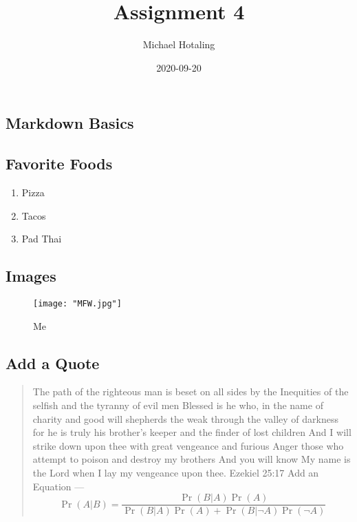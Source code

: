 \documentclass[
]{article}
\title{Assignment 4}
\author{Michael Hotaling}
\date{2020-09-20}
\providecommand{\tightlist}{%
  \setlength{\itemsep}{0pt}\setlength{\parskip}{0pt}}
\begin{document}
\maketitle

\hypertarget{markdown-basics}{%
\subsection{Markdown Basics}\label{markdown-basics}}

\hypertarget{favorite-foods}{%
\subsection{Favorite Foods}\label{favorite-foods}}

\begin{enumerate}
\def\labelenumi{\arabic{enumi}.}
\tightlist
\item
  Pizza
\item
  Tacos
\item
  Pad Thai
\end{enumerate}

\hypertarget{images}{%
\subsection{Images}\label{images}}

\begin{figure}
\centering
\texttt{[image: "MFW.jpg"]}
\caption{Me}
\end{figure}

\hypertarget{add-a-quote}{%
\subsection{Add a Quote}\label{add-a-quote}}

\begin{quote}
The path of the righteous man is beset on all sides by the Inequities of
the selfish and the tyranny of evil men Blessed is he who, in the name
of charity and good will shepherds the weak through the valley of
darkness for he is truly his brother's keeper and the finder of lost
children And I will strike down upon thee with great vengeance and
furious Anger those who attempt to poison and destroy my brothers And
you will know My name is the Lord when I lay my vengeance upon thee.
Ezekiel 25:17 Add an Equation --- \begin{equation}
\Pr(A|B)=\frac{\Pr(B|A)\Pr(A)}{\Pr(B|A)\Pr(A)+\Pr(B|\neg A)\Pr(\neg A)}
\end{equation}
\end{quote}
\end{document}
